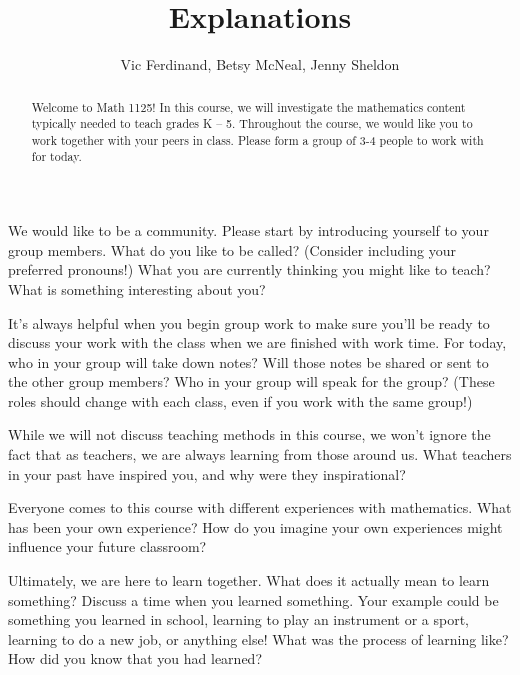 \documentclass[noauthor,nooutcomes]{ximera}
\title{Explanations}
\author{Vic Ferdinand, Betsy McNeal, Jenny Sheldon}
\begin{document}
\begin{abstract} 
Welcome to Math 1125! In this course, we will investigate the mathematics content typically needed to teach grades K -- 5. Throughout the course, we would like you to work together with your peers in class. Please form a group of 3-4 people to work with for today.
\end{abstract}
\maketitle



\begin{question}
We would like to be a community. Please start by introducing yourself to your group members. What do you like to be called? (Consider including your preferred pronouns!) What you are currently thinking you might like to teach? What is something interesting about you?
\end{question}


\begin{question}
It's always helpful when you begin group work to make sure you'll be ready to discuss your work with the class when we are finished with work time. For today, who in your group will take down notes? Will those notes be shared or sent to the other group members? Who in your group will speak for the group? (These roles should change with each class, even if you work with the same group!)
\end{question}


\begin{question}
While we will not discuss teaching methods in this course, we won't ignore the fact that as teachers, we are always learning from those around us. What teachers in your past have inspired you, and why were they inspirational?
\end{question}


\begin{question}
Everyone comes to this course with different experiences with mathematics. What has been your own experience? How do you imagine your own experiences might influence your future classroom?
\end{question}


\begin{question}
Ultimately, we are here to learn together. What does it actually mean to learn something? Discuss a time when you learned something. Your example could be something you learned in school, learning to play an instrument or a sport, learning to do a new job, or anything else! What was the process of learning like? How did you know that you had learned?
\end{question}
\end{document}

